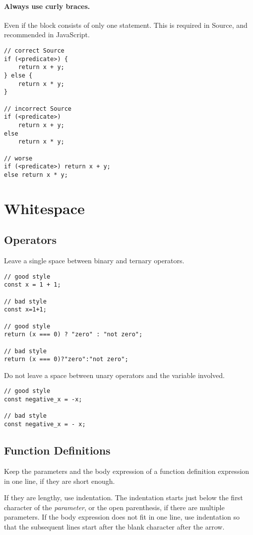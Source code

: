 \paragraph{Always use curly braces.} Even if the block consists of only 
  one statement.
  This is required in Source, and recommended in JavaScript.

\begin{lstlisting}
// correct Source
if (<predicate>) {
    return x + y;
} else {
    return x * y;
}

// incorrect Source
if (<predicate>) 
    return x + y;
else 
    return x * y;

// worse
if (<predicate>) return x + y;
else return x * y;
\end{lstlisting}

\section*{Whitespace}

  \subsection*{Operators}
    Leave a single space between binary and ternary operators.
	
\begin{lstlisting}
// good style
const x = 1 + 1;

// bad style
const x=1+1;

// good style
return (x === 0) ? "zero" : "not zero";

// bad style
return (x === 0)?"zero":"not zero";
\end{lstlisting}
	
	Do not leave a space between unary operators and the variable involved.

\begin{lstlisting}
// good style
const negative_x = -x;

// bad style
const negative_x = - x;
\end{lstlisting}

\subsection*{Function Definitions}

Keep the parameters and the body expression of a function definition expression
in one line, if they are short enough.

If they are lengthy, use
indentation. The indentation starts just below the first character of the \textit{parameter},
or the open parenthesis, if there are multiple parameters. If the body expression does not
fit in one line, use indentation so that the subsequent lines start after the blank character
after the arrow.

